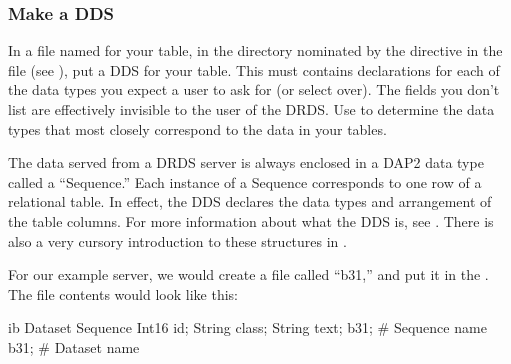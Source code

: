 \documentclass{dods-book}
\begin{document}
\subsubsection{Make a DDS}

In a file named for your table, in the directory nominated by the
 directive in the  file (see
\pageref{server,dodsini,example}), put a DDS for your table.  This
must contains declarations for each of the data types you expect a
user to ask for (or select over).  The fields you don't list are
effectively invisible to the user of the DRDS.  Use
 to determine the data types that
most closely correspond to the data in your tables.

The data served from a DRDS server is always enclosed in a DAP2 data
type called a ``Sequence.''  Each instance of a Sequence corresponds
to one row of a relational table.  In effect, the DDS declares the
data types and arrangement of the table columns.  For more information
about what the DDS is, see \DODSuser.   There is also a very cursory
introduction to these structures in \DODSquick.



For our example server, we would create a file called ``b31,'' and put
it in the .  The file contents would look like
this: 

\begin{vcode}{ib}
Dataset {
  Sequence {
    Int16 id;
    String class;
    String text;
  } b31;  # Sequence name
} b31;    # Dataset name
\end{vcode}
 
\end{document}
